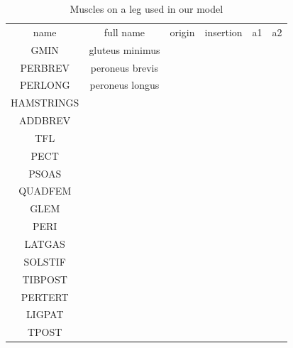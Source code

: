 \documentclass[master,english,final]{kaist-ucs}
\begin{document}
\begin{table}[h!]
\centering
  \begin{tabular}{cccccc}
  name       &  full name                      &  origin       & insertion    & a1     &  a2 \\
  GMIN       & gluteus minimus                 &               &              &    \\
  PERBREV    & peroneus brevis                 &  \\
  PERLONG    & peroneus longus                 &  \\
  HAMSTRINGS &                                 &  \\
  ADDBREV    &                                 &  \\
  TFL        &                                 &  \\
  PECT       &                                 &  \\
  PSOAS      &                                 &  \\
  QUADFEM    &                                 &  \\
  GLEM       &                                 &  \\
  PERI       &                                 &  \\
  LATGAS     &                                 &  \\
  SOLSTIF    &                                 &  \\
  TIBPOST    &                                 &  \\
  PERTERT    &                                 &  \\
  LIGPAT     &                                 &  \\
  TPOST      &                                 &  \\

  \hline
\end{tabular}
\caption{Muscles on a leg used in our model}
\label{muslist}
\end{table}
\end{document}
